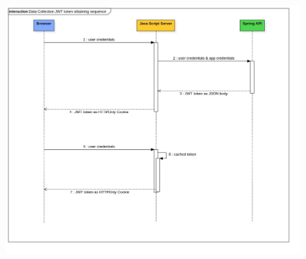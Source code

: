 \begin{figure}[!hbt]
    
    \centering
    \includegraphics[width=\linewidth]{resources/JWT token obtaining sequence.jpg}
    \captionsetup{width=\linewidth}
    \label{fig:jwt-sequence}
\end{figure}